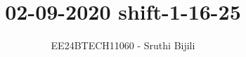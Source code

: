 \documentclass[journal]{IEEEtran}
\begin{document}

\vspace{3cm}

\title{02-09-2020 shift-1-16-25}
\author{EE24BTECH11060 - Sruthi Bijili}
{\let\newpage\relax\maketitle}

\renewcommand{\thefigure}{\theenumi}
\renewcommand{\thetable}{\theenumi}
\setlength{\intextsep}{10pt} %


\renewcommand{\thetable}{\theenumi}
\end{document}
